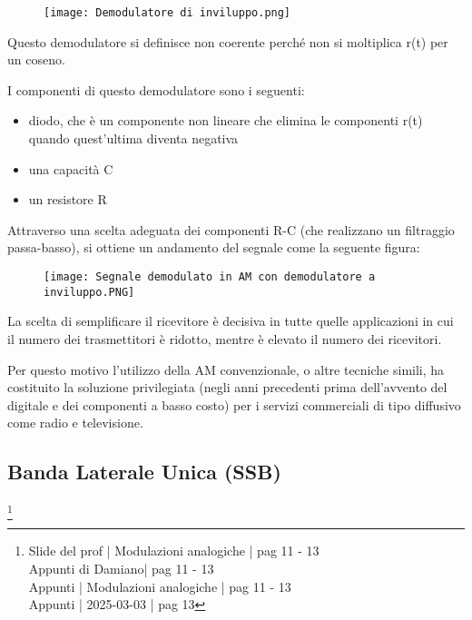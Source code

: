\begin{figure}[h]
    \centering
    \texttt{[image: Demodulatore di inviluppo.png]}
\end{figure} 

Questo demodulatore si definisce non coerente perché non si moltiplica r(t) per un coseno. \newline 

I componenti di questo demodulatore sono i seguenti: 

\begin{itemize}
    \item diodo, che è un componente non lineare che elimina le componenti r(t) quando quest'ultima diventa negativa 
    \item una capacità C 
    \item un resistore R
\end{itemize}

Attraverso una scelta adeguata dei componenti R-C (che realizzano un filtraggio passa-basso), 
si ottiene un andamento del segnale come la seguente figura: 

\begin{figure}[h]
    \centering
    \texttt{[image: Segnale demodulato in AM con demodulatore a inviluppo.PNG]}
\end{figure} 

La scelta di semplificare il ricevitore è decisiva in tutte quelle applicazioni in cui il numero dei trasmettitori è ridotto, 
mentre è elevato il numero dei ricevitori. \newline 

Per questo motivo l'utilizzo della AM convenzionale, o altre tecniche simili,
ha costituito la soluzione privilegiata (negli anni precedenti prima dell'avvento del digitale e dei componenti a basso costo)
per i servizi commerciali di tipo diffusivo come radio e televisione. \newline 

\newpage 

\subsection{Banda Laterale Unica (SSB)}
\footnote{Slide del prof | Modulazioni analogiche | pag 11 - 13\\  
Appunti di Damiano| pag 11 - 13\\
Appunti | Modulazioni analogiche | pag 11 - 13\\
Appunti | 2025-03-03 | pag 13
} 

